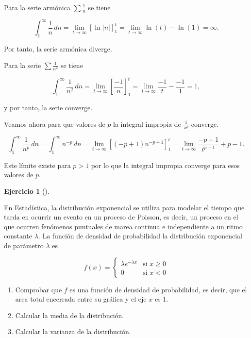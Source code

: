 \documentclass[
  a4paper,
]{scrreport}
\theoremstyle{definition}
\newtheorem{exercise}{Ejercicio}[chapter]
\theoremstyle{remark}
\begin{document}
\begin{tcolorbox}[enhanced jigsaw, colbacktitle=quarto-callout-tip-color!10!white, coltitle=black, arc=.35mm, opacityback=0, breakable, colback=white, bottomtitle=1mm, opacitybacktitle=0.6, rightrule=.15mm, colframe=quarto-callout-tip-color-frame, title=\textcolor{quarto-callout-tip-color}{\faLightbulb}\hspace{0.5em}{Solución}, toptitle=1mm, titlerule=0mm, bottomrule=.15mm, left=2mm, leftrule=.75mm, toprule=.15mm]

Para la serie armónica \(\sum \frac{1}{n}\) se tiene

\[
\int_1^\infty \frac{1}{n}\,dn = \lim_{t\to\infty}\left[\ln|n|\right]_1^t = \lim_{t\to\infty}\ln(t) - \ln(1)= \infty.
\]

Por tanto, la serie armónica diverge.

Para la serie \(\sum \frac{1}{n^2}\) se tiene

\[
\int_1^\infty \frac{1}{n^2}\,dn = \lim_{t\to\infty} \left[\frac{-1}{n}\right]_1^t = \lim_{t\to\infty}\frac{-1}{t}-\frac{-1}{1}= 1,
\]

y por tanto, la serie converge.

Veamos ahora para que valores de \(p\) la integral impropia de
\(\frac{1}{x^p}\) converge.

\[
\int_1^\infty \frac{1}{n^p}\,dn = \int_1^\infty n^{-p}\,dn = \lim_{t\to\infty} \left[(-p+1)n^{-p+1}\right]_1^t = \lim_{t\to\infty}\frac{-p+1}{t^{p-1}}+p-1.
\]

Este límite existe para \(p>1\) por lo que la integral impropia converge
para esos valores de \(p\).

\end{tcolorbox}

\leavevmode{}%
\begin{exercise}[]\label{exr-distribucion-exponencial}

En Estadística, la
\href{https://es.wikipedia.org/wiki/Distribuci\%C3\%B3n_exponencial}{distribución
exponencial} se utiliza para modelar el tiempo que tarda en ocurrir un
evento en un proceso de Poisson, es decir, un proceso en el que ocurren
fenómenos puntuales de marea continua e independiente a un ritmo
constante \(\lambda\). La función de densidad de probabilidad la
distribución exponencial de parámetro \(\lambda\) es

\[
f(x) = 
\begin{cases}
\lambda e^{-\lambda x} & \mbox{si $x\geq 0$}\\
0 & \mbox{si $x<0$}
\end{cases}
\]

\begin{enumerate}
\def\labelenumi{\alph{enumi}.}
\item
  Comprobar que \(f\) es una función de densidad de probabilidad, es
  decir, que el area total encerrada entre su gráfica y el eje \(x\) es
  1.
\item
  Calcular la media de la distribución.
\item
  Calcular la varianza de la distribución.
\end{enumerate}

\end{exercise}
\end{document}
